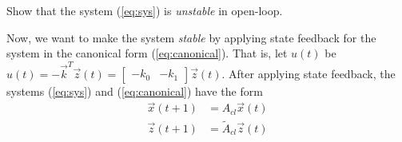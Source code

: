 \begin{enumerate}[resume]
\qitem Show that the system (\ref{eq:sys}) is \textit{unstable} in open-loop.

\end{enumerate}

Now, we want to make the system \textit{stable} by applying state feedback for the system in the canonical form (\ref{eq:canonical}).
That is, let $u(t)$ be $u(t) = -\vec{k}^T\vec{z}(t) = \begin{bmatrix}
-k_0 & -k_1
\end{bmatrix}
\vec{z}(t)$.
After applying state feedback, the systems (\ref{eq:sys}) and (\ref{eq:canonical}) have the form
\begin{align*}
\vec{x}(t+1) &= A_{cl} \vec{x}(t) \\
\vec{z}(t+1) &= \widetilde{A}_{cl} \vec{z}(t)
\end{align*}

